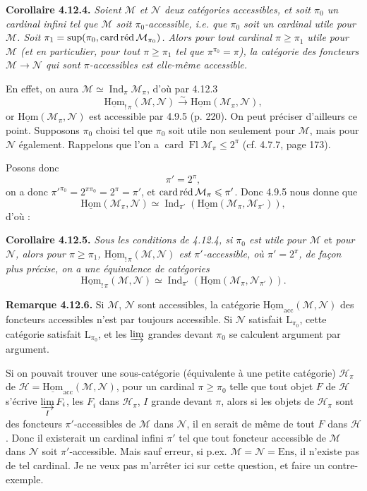 \documentclass[11pt]{article}
\newcommand{\printedpage}[1]{\marginpar{\footnotesize p.~#1}}
\newcommand{\msp}[1]{\marginpar{\footnotesize [#1]}}
\newcommand{\M}{\mathcal{M}}
\newcommand{\N}{\mathcal{N}}
\newcommand{\cH}{\mathcal{H}}
\newcommand{\Hom}{\underline{\mathrm{Hom}}}
\newcommand{\Ind}{\operatorname{Ind}}
\newcommand{\Fl}{\operatorname{Fl}}
\newcommand{\card}{\operatorname{card}}
\newcommand{\red}{\mathop{\textup{réd}}\nolimits}
\begin{document}
\printedpage{104}
\msp{page 278}
\textbf{Corollaire 4.12.4.} \textit{Soient $\M$ et $\N$ deux catégories accessibles, et soit $\pi_0$ un cardinal infini tel que $\M$ soit $\pi_0$-accessible, i.e. que $\pi_0$ soit un cardinal utile pour $\M$. Soit $\pi_1 = \sup(\pi_0,\allowbreak \card\red\M_{\pi_0})$. Alors pour tout cardinal $\pi \geqslant \pi_1$ utile pour $\M$ (et en particulier, pour tout $\pi \geqslant \pi_1$ tel que $\pi^{\pi_0} = \pi$), la catégorie des foncteurs $\M \longrightarrow \N$ qui sont $\pi$-accessibles est elle-même accessible.}

En effet, on aura $\M \simeq \Ind_\pi\M_\pi$, d'où par 4.12.3
\[
\Hom_{!\,\pi}(\M,\N) \xrightarrow{\sim} \Hom(\M_\pi,\N) ,
\]
or $\Hom(\M_\pi,\N)$ est accessible par 4.9.5 (p. 220). On peut préciser d'ailleurs ce point. Supposons $\pi_0$ choisi tel que $\pi_0$ soit utile non seulement pour $\M$, mais pour $\N$ également. Rappelons que l'on a $\card\Fl\M_\pi \leqslant 2^\pi$ (cf. 4.7.7, page 173).

\msp{page 279}
Posons donc
\[
\pi' = 2^\pi ,
\]
on a donc $\pi'^{\pi_0} = 2^{\pi\pi_0} = 2^\pi = \pi'$, et $\card\red\M_\pi \leqslant \pi'$. Donc 4.9.5 nous donne que
\[
\Hom(\M_\pi,\N) \simeq \Ind_{\pi'}(\Hom(\M_\pi,\M_{\pi'})) , %
\]
d'où :

\textbf{Corollaire 4.12.5.} \textit{Sous les conditions de 4.12.4, si $\pi_0$ est utile pour $\M$} et \textit{pour $\N$, alors pour $\pi \geqslant \pi_1$, $\Hom_{!\,\pi}(\M,\N)$ est $\pi'$-accessible, où $\pi' = 2^\pi$, de façon plus précise, on a une équivalence de catégories}
\[
\Hom_{!\,\pi}(\M,\N) \simeq \Ind_{\pi'}(\Hom(\M_\pi,\N_{\pi'})) .
\]

\textbf{Remarque 4.12.6.} Si $\M$, $\N$ sont accessibles, la catégorie $\Hom_{\mathrm{acc}}(\M,\N)$ des foncteurs accessibles n'est par toujours accessible. Si $\N$ satisfait $\mathrm{L}_{\pi_0}$, cette catégorie satisfait $\mathrm{L}_{\pi_0}$, %
et les $\varinjlim$ grandes devant $\pi_0$ se calculent argument par argument.

\msp{page 280}
Si on pouvait trouver une sous-catégorie (équivalente à une petite catégorie) $\cH_\pi$ de $\cH = \Hom_{\mathrm{acc}}(\M,\N)$, pour un cardinal $\pi \geqslant \pi_0$ telle que tout objet $F$ de $\cH$ s'écrive $\varinjlim\limits_{I} F_i$, les $F_i$ dans $\cH_\pi$, $I$ grande devant $\pi$, alors si les objets de $\cH_\pi$ sont des foncteurs $\pi'$-accessibles de $\M$ dans $\N$, il en serait de même de tout $F$ dans $\cH$. Donc il existerait un cardinal infini $\pi'$ tel que tout foncteur accessible de $\M$ dans $\N$ soit $\pi'$-accessible. Mais sauf erreur, si p.ex. $\M = \N = \mathrm{Ens}$, il n'existe pas de tel cardinal. Je ne veux pas m'arrêter ici sur cette question, et faire un contre-exemple.
\end{document}
